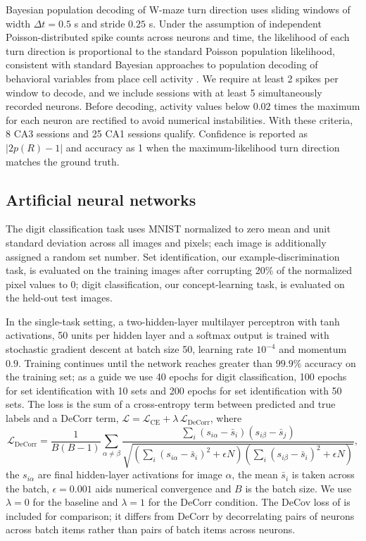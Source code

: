 \documentclass[11pt]{article}
\begin{document}
Bayesian population decoding of W-maze turn direction uses sliding windows
of width $\Delta t = 0.5$ s and stride $0.25$ s. Under the assumption of
independent Poisson-distributed spike counts across neurons and time, the
likelihood of each turn direction is proportional to the standard Poisson
population likelihood, consistent with standard Bayesian approaches to
population decoding of behavioral variables from place cell activity
\cite{zeithamova2019brain,skaggs1996theta}. We require at
least 2 spikes per window to decode, and we include sessions with at least
5 simultaneously recorded neurons. Before decoding, activity values below
$0.02$ times the maximum for each neuron are rectified to avoid numerical
instabilities. With these criteria, 8 CA3 sessions and 25 CA1 sessions
qualify. Confidence is reported as $|2p(R) - 1|$ and accuracy as 1 when the
maximum-likelihood turn direction matches the ground truth.

\subsection{Artificial neural networks}

The digit classification task uses MNIST \cite{lecun1998gradient} normalized
to zero mean and unit standard deviation across all images and pixels; each
image is additionally assigned a random set number. Set identification, our
example-discrimination task, is evaluated on the training images after
corrupting 20\% of the normalized pixel values to 0; digit classification,
our concept-learning task, is evaluated on the held-out test images.

In the single-task setting, a two-hidden-layer multilayer perceptron with
tanh activations, 50 units per hidden layer and a softmax output is trained
with stochastic gradient descent at batch size 50, learning rate $10^{-4}$
and momentum $0.9$. Training continues until the network reaches greater
than $99.9\%$ accuracy on the training set; as a guide we use 40 epochs for
digit classification, 100 epochs for set identification with 10 sets and
200 epochs for set identification with 50 sets. The loss is the sum of a
cross-entropy term between predicted and true labels and a DeCorr term,
$\mathcal{L} = \mathcal{L}_{\mathrm{CE}} + \lambda\, \mathcal{L}_{\mathrm{DeCorr}}$,
where
\begin{equation}
\mathcal{L}_{\mathrm{DeCorr}} = \frac{1}{B(B-1)} \sum_{\alpha \neq \beta}
\frac{\sum_i (s_{i\alpha} - \bar s_i)(s_{i\beta} - \bar s_j)}
{\sqrt{\left(\sum_i (s_{i\alpha}-\bar s_i)^2 + \epsilon N\right)
\left(\sum_i (s_{i\beta}-\bar s_i)^2 + \epsilon N\right)}},
\end{equation}
the $s_{i\alpha}$ are final hidden-layer activations for image $\alpha$, the
mean $\bar s_i$ is taken across the batch, $\epsilon = 0.001$ aids numerical
convergence and $B$ is the batch size. We use $\lambda = 0$ for the baseline
and $\lambda = 1$ for the DeCorr condition. The DeCov loss of
\cite{cogswell2016reducing} is included for comparison; it differs from
DeCorr by decorrelating pairs of neurons across batch items rather than pairs
of batch items across neurons.
\end{document}
